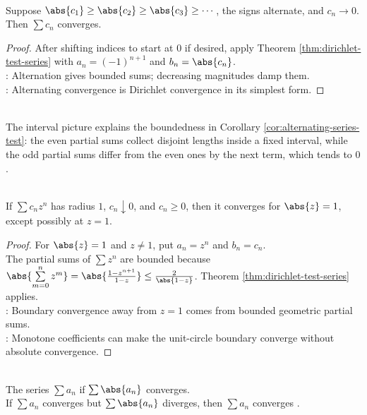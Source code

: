 \begin{corollary} \label{cor:alternating-series-test} \\
Suppose $\abs{c_1}\geq\abs{c_2}\geq\abs{c_3}\geq\cdots$, the signs alternate, and $c_n\to0$. Then $\sum c_n$ converges.
\begin{proof}
After shifting indices to start at $0$ if desired, apply Theorem \ref{thm:dirichlet-test-series} with $a_n=(-1)^{n+1}$ and $b_n=\abs{c_n}$.\\
: Alternation gives bounded sums; decreasing magnitudes damp them.\\
: Alternating convergence is Dirichlet convergence in its simplest form.
\end{proof}
\end{corollary}

\begin{perspective} \label{per:alternating-series-interval-picture} \\
The interval picture explains the boundedness in Corollary \ref{cor:alternating-series-test}: the even partial sums collect disjoint lengths inside a fixed interval, while the odd partial sums differ from the even ones by the next term, which tends to $0$.
\end{perspective}

\begin{theorem} \label{thm:power-series-boundary-dirichlet} \\
If $\sum c_nz^n$ has radius $1$, $c_n\downarrow0$, and $c_n\geq0$, then it converges for $\abs{z}=1$, except possibly at $z=1$.
\begin{proof}
For $\abs{z}=1$ and $z\neq1$, put $a_n=z^n$ and $b_n=c_n$.\\
The partial sums of $\sum z^n$ are bounded because $\abs{\sum\limits_{m=0}^{n}z^m}=\abs{\frac{1-z^{n+1}}{1-z}}\leq\frac{2}{\abs{1-z}}$. Theorem \ref{thm:dirichlet-test-series} applies.\\
: Boundary convergence away from $z=1$ comes from bounded geometric partial sums.\\
: Monotone coefficients can make the unit-circle boundary converge without absolute convergence.
\end{proof}
\end{theorem}

\begin{definition} \label{def:absolute-and-nonabsolute-convergence} \\
The series $\sum a_n$  if $\sum\abs{a_n}$ converges.\\
If $\sum a_n$ converges but $\sum\abs{a_n}$ diverges, then $\sum a_n$ converges .
\end{definition}

